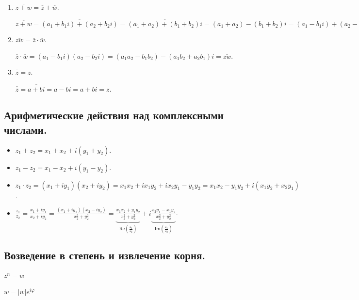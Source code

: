 \begin{enumerate}[label={\arabic*°.}]
    \item $\overline{z + w} = \overline{z} + \overline{w}.$
    
    $\overline{z + w} = \overline{(a_1 + b_1 i) + (a_2 + b_2 i)} = \overline{(a_1 + a_2) + (b_1 + b_2) i} = (a_1 + a_2) - (b_1 + b_2)i = (a_1 - b_1 i) + (a_2 - b_2 i) = \overline{z} + \overline{w}.$
    
    \item $\overline{zw} = \overline{z} \cdot \overline{w}.$
    
    $\overline{z} \cdot \overline{w} = (a_1 - b_1 i) (a_2 - b_2 i) = (a_1 a_2 - b_1 b_2) - (a_1 b_2 + a_2 b_1) i = \overline{zw}.$

    \item $\overline{\overline{z}} = z.$

    $\overline{\overline{z}} = \overline{\overline{a + bi}} = \overline{a - bi} = a + bi = z.$
\end{enumerate}


\newpage


\subsection{
    Арифметические действия над комплексными числами.
}

\begin{itemize}[nosep]
    \item $z_1 + z_2 = x_1 + x_2 + i(y_1 + y_2)$.
    \item $z_1 - z_2 = x_1 - x_2 + i(y_1 - y_2)$.
    \item $z_1 \cdot z_2 = (x_1 + iy_1)(x_2 + iy_2) = x_1x_2 + ix_1y_2 + ix_2y_1 - y_1y_2 = x_1x_2 - y_1y_2 + i(x_1y_2 + x_2y_1)$.
    \item $\frac{z_1}{z_2} = \frac{x_1 + iy_1}{x_2 + iy_2} = \frac{(x_1 + iy_1)(x_2 - iy_2)}{x_2^2 + y_2^2} = \underbrace{\frac{x_1x_2 + y_1y_2}{x_2^2 + y_2^2}}_{\text{Re}(\frac{z_1}{z_2})} + i\underbrace{\frac{x_2y_1 - x_1y_2}{x_2^2 + y_2^2}}_{\text{Im}(\frac{z_1}{z_2})}$.
\end{itemize}

\subsection{
    Возведение в степень и извлечение корня.
}

$z^n = w$

$w = |w|e^{i\varphi}$

